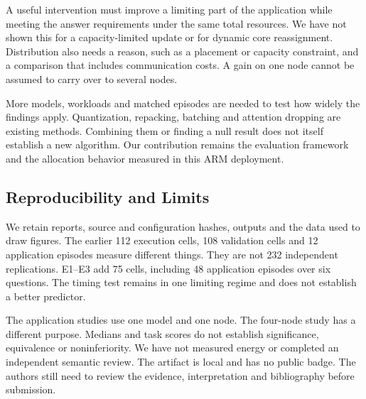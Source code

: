 A useful intervention must improve a limiting part of the application while
meeting the answer requirements under the same total resources. We have not
shown this for a capacity-limited update or for dynamic core reassignment.
Distribution also needs a reason, such as a placement or capacity constraint,
and a comparison that includes communication costs. A gain on one node cannot
be assumed to carry over to several nodes.

More models, workloads and matched episodes are needed to test how widely
the findings apply. Quantization, repacking, batching and attention dropping
are existing methods. Combining them or finding a null result does not itself
establish a new algorithm. Our contribution remains the evaluation framework and the
allocation behavior measured in this ARM deployment.

\subsection{Reproducibility and Limits}
We retain reports, source and configuration hashes, outputs and the data used
to draw figures. The earlier 112 execution cells, 108 validation cells and
12 application episodes measure different things. They are not 232 independent
replications. E1--E3 add 75 cells, including 48 application episodes over six
questions. The timing test remains in one limiting regime and does not establish
a better predictor.

The application studies use one model and one node. The four-node study has
a different purpose. Medians and task scores do not establish significance,
equivalence or noninferiority. We have not measured energy or completed an
independent semantic review. The artifact is local and has no public badge.
The authors still need to review the evidence, interpretation and bibliography
before submission.
